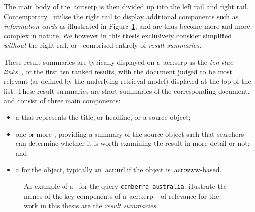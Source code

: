 The main body of the~\gls{acr:serp} is then divided up into the left rail and right rail. Contemporary~ utilise the right rail to display additional components such as \emph{information cards} as illustrated in Figure~\ref{fig:serp_example}, and are thus become more and more complex in nature. We however in this thesis exclusively consider simplified~ \emph{without} the right rail, or~ comprised entirely of \emph{result summaries.}

These result summaries are typically displayed on a~\gls{acr:serp} as the \emph{ten blue links}~\citep{hearst2009_search}, or the first ten ranked results, with the document judged to be most relevant (as defined by the underlying retrieval model) displayed at the top of the list. These result summaries are short summaries of the corresponding document, and consist of three main components:

\begin{itemize}
    \item{a  that represents the title, or headline, or a source object;}
    \item{one or more , providing a summary of the source object such that searchers can determine whether it is worth examining the result in more detail or not; and}
    \item{a  for the object, typically an~\gls{acr:url} if the object is~\gls{acr:www}-based.}
\end{itemize}

\begin{figure}[t!]
    \centering
    \caption[Example of a~\gls{acr:serp}]{An example of a~ for the query \texttt{canberra australia}.  illustrate the names of the key components of a~\gls{acr:serp} – of relevance for the work in this thesis are the \emph{result summaries.}}
    \label{fig:serp_example}
\end{figure}

